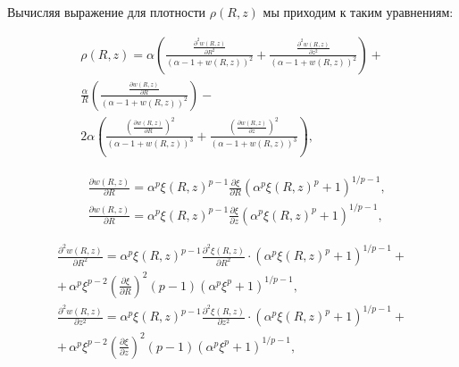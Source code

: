  Вычисляя выражение для плотности $\rho (R,z)$ мы приходим к таким уравнениям:
 
 \begin{equation}
 \begin{split}
\rho (R,z) = \alpha\left( \frac{\displaystyle\frac{\displaystyle\partial^2w(R,z) }{\displaystyle\partial R^2}}{(\displaystyle\alpha - 1 + w(R,z))^2} + \frac{\displaystyle\frac{ \partial^2w(R,z) }{\partial z^2}}{\displaystyle(\alpha - 1 + w(R,z))^2}\right) +\\ 
\frac{\alpha}{R} \left(\frac{\displaystyle\frac{ \partial w(R,z) }{\partial R}}{\displaystyle(\alpha - 1 + w(R,z))^2}\right) - \\ 
2\alpha \left( \frac{\displaystyle \left(\frac{ \partial w(R,z) }{\partial R}\right)^2}{\displaystyle(\alpha - 1 + w(R,z))^3} + \frac{\displaystyle\left(\frac{ \partial w(R,z) }{\partial z}\right)^2}{\displaystyle(\alpha - 1 + w(R,z))^3}\right),\text{~}
 \end{split}
 \end{equation}
 
 \begin{equation}
 \begin{split}  
&\frac{\partial w(R,z)}{\partial R} = \alpha ^p \xi (R,z)^{p-1} \frac{\partial \xi}{\partial R} \left( \alpha^p \xi(R,z)^p +1  \right)^{1/p -1}, \\
&\frac{\partial w(R,z)}{\partial R} = \alpha ^p \xi (R,z)^{p-1} \frac{\partial \xi}{\partial z} \left( \alpha^p \xi(R,z)^p +1  \right)^{1/p -1},
 \end{split}
 \end{equation}
 
 \begin{equation}
 \begin{split}  
\frac{ \partial^2w(R,z) }{\partial R^2} = \alpha^p \xi(R,z)^{p-1} \frac{ \partial^2\xi(R,z) }{\partial R^2} \cdot (\alpha^p \xi(R,z)^p + 1) ^ {1/p - 1} + \\
+\, \alpha^p\xi^{p-2} \left( \frac{\partial \xi}{\partial R} \right)^2 (p-1) (\alpha^p \xi^p + 1)^{1/p - 1}, \\
\frac{ \partial^2w(R,z) }{\partial z^2} = \alpha^p \xi(R,z)^{p-1} \frac{ \partial^2\xi(R,z) }{\partial z^2} \cdot (\alpha^p \xi(R,z)^p + 1) ^ {1/p - 1} + \\
+\, \alpha^p\xi^{p-2} \left( \frac{\partial \xi}{\partial z} \right)^2 (p-1) (\alpha^p \xi^p + 1)^{1/p - 1},
 \end{split}
 \end{equation}
 
